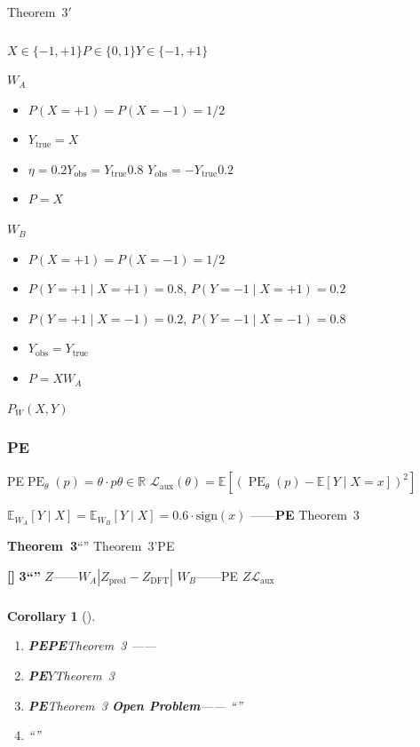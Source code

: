 \documentclass[11pt,a4paper]{article}
\newtheorem{corollary}[theorem]{Corollary}
\theoremstyle{remark}
\DeclareMathOperator{\PE}{PE}
\newcommand{\R}{\mathbb{R}}
\newcommand{\E}{\mathbb{E}}
\newcommand{\openproblem}{\textnormal{\textbf{[]}}}
\begin{document}
Theorem~$3'$

\subsubsection{}

$X \in \{-1, +1\}$$P \in \{0, 1\}$$Y \in \{-1, +1\}$

\textbf{$W_A$}
\begin{itemize}
    \item $P(X=+1) = P(X=-1) = 1/2$
    \item $Y_{\text{true}} = X$
    \item $\eta = 0.2$$Y_{\text{obs}} = Y_{\text{true}}$$0.8$
          $Y_{\text{obs}} = -Y_{\text{true}}$$0.2$
    \item $P = X$
\end{itemize}

\textbf{$W_B$}
\begin{itemize}
    \item $P(X=+1) = P(X=-1) = 1/2$
    \item $P(Y=+1 \mid X=+1) = 0.8$, $P(Y=-1 \mid X=+1) = 0.2$
    \item $P(Y=+1 \mid X=-1) = 0.2$, $P(Y=-1 \mid X=-1) = 0.8$
    \item $Y_{\text{obs}} = Y_{\text{true}}$
    \item $P = X$$W_A$
\end{itemize}

\textbf{}$P_{W}(X, Y)$

\subsubsection{PE}

PE$\PE_\theta(p) = \theta \cdot p$$\theta \in \R$
$\mathcal{L}_{\text{aux}}(\theta) = \E[(\PE_\theta(p) - \E[Y \mid X=x])^2]$

\textbf{}$\E_{W_A}[Y \mid X] = \E_{W_B}[Y \mid X] = 0.6 \cdot \text{sign}(x)$
——\textbf{}\textbf{PE}
Theorem~3

\textbf{Theorem~3}``''
Theorem~3'\textbf{}PE\textbf{}


\openproblem{} \textbf{3``''}
\textbf{}$Z$——$W_A$$|Z_{\text{pred}} - Z_{\text{DFT}}|$
$W_B$——PE
\textbf{}\textbf{}
$Z$$\mathcal{L}_{\text{aux}}$


\subsubsection{}

\begin{corollary}[]
\label{cor:4.4.1}
\begin{enumerate}[label=(\arabic*)]
    \item \textbf{PEPE}Theorem~3
          ——\textbf{}
    \item \textbf{PE}$Y$Theorem~3
    \item \textbf{PE}Theorem~3\textbf{}
          \textbf{Open Problem}——
          ``''
    \item \textbf{}
          ``''
\end{enumerate}
\end{corollary}
\end{document}
